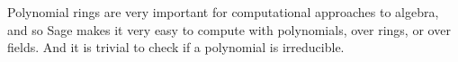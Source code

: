 Polynomial rings are very important for computational approaches to algebra, and so Sage makes it very easy to compute with polynomials, over rings, or over fields.  And it is trivial to check if a polynomial is irreducible.